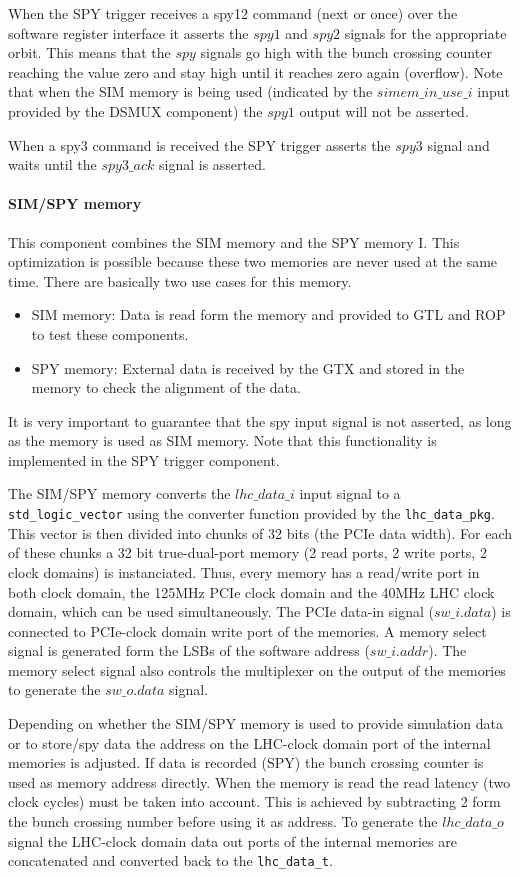 When the SPY trigger receives a spy12 command (next or once) over the software register interface it asserts the $spy1$ and $spy2$ signals for the appropriate orbit. 
This means that the $spy$ signals go high with the bunch crossing counter reaching the value zero and stay high until it reaches zero again (overflow). Note that when 
the SIM memory is being used (indicated by the $simem\_in\_use\_i$ input provided by the DSMUX component) the $spy1$ output will not be asserted.

When a spy3 command is received the SPY trigger asserts the $spy3$ signal and waits until the $spy3\_ack$ signal is asserted.

\paragraph{SIM/SPY memory}
This component combines the SIM memory and the SPY memory I. This optimization is possible because these two memories are never used at the same time. There are basically 
two use cases for this memory.
\begin{itemize}
\item SIM memory: Data is read form the memory and provided to GTL and ROP to test these components.
\item SPY memory: External data is received by the GTX and stored in the memory to check the alignment of the data.  
\end{itemize}
It is very important to guarantee that the spy input signal is not asserted, as long as the memory is used as SIM memory. Note that this functionality is implemented in 
the SPY trigger component.

The SIM/SPY memory converts the $lhc\_data\_i$ input signal to a \texttt{std\_logic\_vector} using the converter function provided by the \texttt{lhc\_data\_pkg}. This vector 
is then divided into chunks of 32 bits (the PCIe data width). For each of these chunks a 32 bit true-dual-port memory (2 read ports, 2 write ports, 2 clock domains) is instanciated. 
Thus, every memory has a read/write port in both clock domain, the 125MHz PCIe clock domain and the 40MHz LHC clock domain, which can be used simultaneously.
The PCIe data-in signal ($sw\_i.data$) is connected to PCIe-clock domain write port of the memories. A memory select signal is generated form the LSBs of the software address ($sw\_i.addr$). 
The memory select signal also controls the multiplexer on the output of the memories to generate the $sw\_o.data$ signal.

Depending on whether the SIM/SPY memory is used to provide simulation data or to store/spy data the address on the LHC-clock domain port of the internal memories is adjusted.
If data is recorded (SPY) the bunch crossing counter is used as memory address directly. 
When the memory is read the read latency (two clock cycles) must be taken into account. 
This is achieved by subtracting 2 form the bunch crossing number before using it as address.
To generate the $lhc\_data\_o$ signal the LHC-clock domain data out ports of the internal memories are concatenated and converted back to the \texttt{lhc\_data\_t}.

